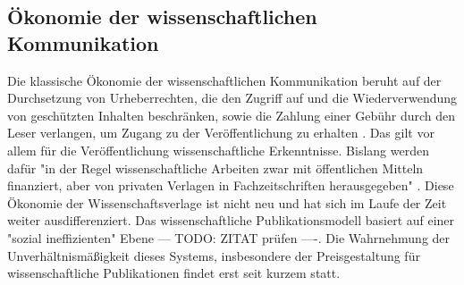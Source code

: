 \subsection{Ökonomie der wissenschaftlichen Kommunikation}
Die klassische Ökonomie der wissenschaftlichen Kommunikation beruht auf der Durchsetzung von Urheberrechten, die den Zugriff auf und die Wiederverwendung von geschützten Inhalten beschränken, sowie die Zahlung einer Gebühr durch den Leser verlangen, um Zugang zu der Veröffentlichung zu erhalten \cite{CREATe_2014}. Das gilt vor allem für die Veröffentlichung wissenschaftliche Erkenntnisse. Bislang werden dafür "in der Regel wissenschaftliche Arbeiten zwar mit öffentlichen Mitteln finanziert, aber von privaten Verlagen in Fachzeitschriften herausgegeben" \cite{WD_bundestag_2009}. Diese Ökonomie der Wissenschaftsverlage ist nicht neu und hat sich im Laufe der Zeit weiter ausdifferenziert. Das wissenschaftliche Publikationsmodell basiert auf einer "sozial ineffizienten" Ebene \cite{mueller-langer_2010} --- TODO: ZITAT prüfen ----. Die Wahrnehmung der Unverhältnismäßigkeit dieses Systems, insbesondere der Preisgestaltung für wissenschaftliche Publikationen \cite{King_2008} findet erst seit kurzem statt\cite{CREATe_2014}. 


